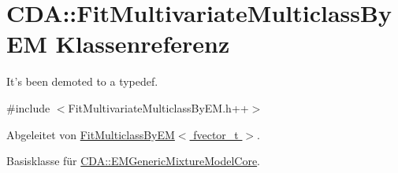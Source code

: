 \hypertarget{classCDA_1_1FitMultivariateMulticlassByEM}{
\section{CDA::FitMultivariateMulticlassByEM Klassenreferenz}
\label{classCDA_1_1FitMultivariateMulticlassByEM}
}


It's been demoted to a typedef.  




{\ttfamily \#include $<$FitMultivariateMulticlassByEM.h++$>$}



Abgeleitet von \hyperlink{classCDA_1_1FitMulticlassByEM}{FitMulticlassByEM$<$ fvector\_\-t $>$}.



Basisklasse für \hyperlink{classCDA_1_1EMGenericMixtureModelCore}{CDA::EMGenericMixtureModelCore}.



